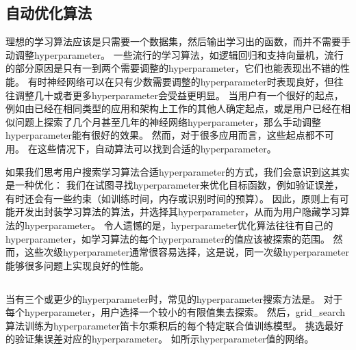 
\subsection{自动优化算法}
\label{sec:automatic_hyperparameter_optimization_algorithms}
理想的学习算法应该是只需要一个数据集，然后输出学习出的函数，而并不需要手动调整\gls{hyperparameter}。
一些流行的学习算法，如逻辑回归和支持向量机，流行的部分原因是只有一到两个需要调整的\gls{hyperparameter}，它们也能表现出不错的性能。
有时神经网络可以在只有少数需要调整的\gls{hyperparameter}时表现良好，但往往调整几十或者更多\gls{hyperparameter}会受益更明显。
当用户有一个很好的起点，例如由已经在相同类型的应用和架构上工作的其他人确定起点，或是用户已经在相似问题上探索了几个月甚至几年的神经网络\gls{hyperparameter}，那么手动调整\gls{hyperparameter}能有很好的效果。
然而，对于很多应用而言，这些起点都不可用。
在这些情况下，自动算法可以找到合适的\gls{hyperparameter}。

如果我们思考用户搜索学习算法合适\gls{hyperparameter}的方式，我们会意识到这其实是一种优化：
我们在试图寻找\gls{hyperparameter}来优化目标函数，例如验证误差，有时还会有一些约束（如训练时间，内存或识别时间的预算）。
因此，原则上有可能开发出封装学习算法的算法，并选择其\gls{hyperparameter}，从而为用户隐藏学习算法的\gls{hyperparameter}。
令人遗憾的是，\gls{hyperparameter}优化算法往往有自己的\gls{hyperparameter}，如学习算法的每个\gls{hyperparameter}的值应该被探索的范围。
然而，这些次级\gls{hyperparameter}通常很容易选择，这是说，同一次级\gls{hyperparameter}能够很多问题上实现良好的性能。

\subsection{}
\label{sec:grid_search}
当有三个或更少的\gls{hyperparameter}时，常见的\gls{hyperparameter}搜索方法是。
对于每个\gls{hyperparameter}，用户选择一个较小的有限值集去探索。
然后，\gls{grid_search}算法训练为\gls{hyperparameter}笛卡尔乘积后的每个特定联合值训练模型。
挑选最好的验证集误差对应的\gls{hyperparameter}。
如所示\gls{hyperparameter}值的网络。


